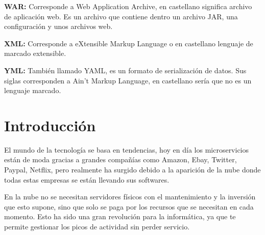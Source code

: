 \documentclass[12pt]{report} %
\begin{document}
\textbf{WAR:} Corresponde a Web Application Archive, en castellano significa archivo de aplicación web. Es un archivo que contiene dentro un archivo JAR, una configuración y unos archivos web.

\textbf{XML:} Corresponde a eXtensible Markup Language o en castellano lenguaje de marcado extensible.

\textbf{YML:} También llamado YAML, es un formato de serialización de datos. Sus siglas corresponden a Ain't Markup Language, en castellano sería que no es un lenguaje marcado.


\vfill

\newpage %
\thispagestyle{empty}
\mbox{}
	


\tableofcontents
\thispagestyle{fancy}

\newpage %
\thispagestyle{empty}
\mbox{}

\listoffigures
\thispagestyle{fancy}

\newpage %
\thispagestyle{empty}
\mbox{}

\listoftables
\thispagestyle{fancy}

\newpage %
\thispagestyle{empty}
\mbox{}


\clearpage
{} %

\chapter{Introducción}

	El mundo de la tecnología se basa en tendencias, hoy en día los microservicios están de moda gracias a grandes compañías como Amazon, Ebay, Twitter, Paypal, Netflix, pero realmente ha surgido debido a la aparición de la nube donde todas estas empresas se están llevando sus softwares.
	
	En la nube no se necesitan servidores físicos con el mantenimiento y la inversión que esto supone, sino que solo se paga por los recursos que se necesitan en cada momento. Esto ha sido una gran revolución para la informática, ya que te permite gestionar los picos de actividad sin perder servicio.
	
\end{document}
